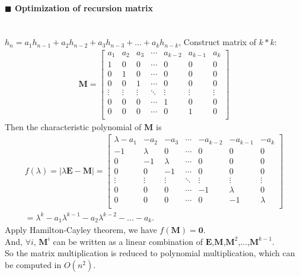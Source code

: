 \documentclass[10pt]{article}
\begin{document}
\paragraph{$\blacksquare$ Optimization of recursion matrix}
\noindent \\
$h_n=a_1h_{n-1}+a_2h_{n-2}+a_3h_{n-3}+ \ldots + a_kh_{n-k}$, Construct matrix of $k*k$:
\begin{gather*}
  \mathbf{M} =
  \begin{bmatrix}
    a_1 & a_2 & a_3 & \cdots & a_{k-2} & a_{k-1} & a_k \\
    1 & 0 & 0 & \cdots & 0 & 0 & 0 \\
    0 & 1 & 0 & \cdots & 0 & 0 & 0 \\
    0 & 0 & 1 & \cdots & 0 & 0 & 0 \\
    \vdots & \vdots & \vdots & \ddots & \vdots & \vdots & \vdots \\
    0 & 0 & 0 & \cdots & 1 & 0 & 0 \\
    0 & 0 & 0 & \cdots & 0 & 1 & 0 \\
  \end{bmatrix}
\end{gather*}
Then the characteristic polynomial of $\mathbf{M}$ is
\begin{gather*}
  f(\lambda)=|\lambda \mathbf{E} - \mathbf{M}| =
  \begin{bmatrix}
    \lambda - a_1 & -a_2 & -a_3 & \cdots & -a_{k-2} & -a_{k-1} & -a_k \\
    -1 & \lambda & 0 & \cdots & 0 & 0 & 0 \\
    0 & -1 & \lambda & \cdots & 0 & 0 & 0 \\
    0 & 0 & -1 & \cdots & 0 & 0 & 0 \\
    \vdots & \vdots & \vdots & \ddots & \vdots & \vdots & \vdots \\
    0 & 0 & 0 & \cdots & -1 & \lambda & 0 \\
    0 & 0 & 0 & \cdots & 0 & -1 & \lambda \\
  \end{bmatrix}
  \\
  =\lambda ^k - a_1 \lambda ^ {k-1} - a_2 \lambda ^ {k-2} - \ldots - a_k.
\end{gather*}
Apply Hamilton-Cayley theorem, we have $f(\mathbf{M})=\mathbf{0}$. \\
And, $\forall i$, $\mathbf{M} ^ i$ can be written as a linear combination of $\mathbf{E}$,$\mathbf{M}$,$\mathbf{M} ^2$,$\ldots$,$\mathbf{M} ^ {k-1}$.\\
So the matrix multiplication is reduced to polynomial multiplication, which can be computed in $O(n^2)$. \\

\end{document}
